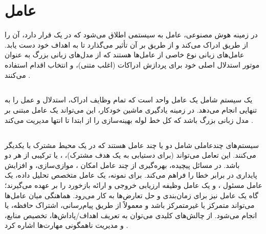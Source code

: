 \section{عامل}
در زمینه هوش مصنوعی، عامل به سیستمی اطلاق می‌شود که در یک  قرار دارد، آن را از طریق  ادراک می‌کند و از طریق  بر آن تأثیر می‌گذارد تا به اهداف خود دست یابد. عامل‌های زبانی نوع خاصی از عامل‌ها هستند که از مدل‌های زبانی بزرگ به عنوان موتور استدلال اصلی خود برای پردازش ادراکات (اغلب متنی)،  و انتخاب اقدام استفاده می‌کنند \cite{wang2024survey}.

\subsection[تک‌عاملی]{}
یک سیستم  شامل یک عامل واحد است که تمام وظایف ادراک، استدلال و عمل را به تنهایی انجام می‌دهد. در زمینه یادگیری ماشین خودکار، این می‌تواند یک عامل مبتنی بر مدل زبانی بزرگ باشد که کل خط لوله بهینه‌سازی را از ابتدا تا انتها مدیریت می‌کند \cite{wang2024survey}.

\subsection[چندعاملی]{}
سیستم‌های چندعاملی شامل دو یا چند عامل هستند که در یک محیط مشترک با یکدیگر  می‌کنند. این تعامل می‌تواند  (برای دستیابی به یک هدف مشترک)، ، یا ترکیبی از هر دو باشد. در مسائل پیچیده، بهره‌گیری از چند عامل امکان ، موازی‌سازی، و افزایش پایداری در برابر خطا را فراهم می‌کند. برای نمونه، یک عامل متخصص تحلیل داده، یک عامل مسئول ، و یک عامل  وظیفه ارزیابی خروجی و ارائه بازخورد را بر عهده می‌گیرند؛ گاه یک عامل  نیز برای زمان‌بندی و حل تعارض‌ها  به کار می‌رود. هماهنگی میان عامل‌ها می‌تواند متمرکز یا غیرمتمرکز باشد و معمولاً از طریق پیام‌رسانی، اشتراک حافظه، یا  انجام می‌شود. از چالش‌های کلیدی می‌توان به تعریف اهداف/پاداش‌ها، تخصیص منابع، و مدیریت ناهمگونی مهارت‌ها اشاره کرد \cite{wang2024survey}.
